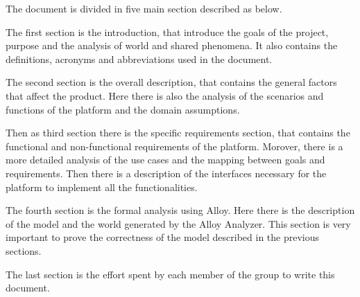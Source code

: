 The document is divided in five main section described as below.

The first section is the introduction, that introduce the goals of the project, purpose and the analysis of world and shared phenomena. It also contains the definitions, acronyms and abbreviations used in the document. 

The second section is the overall description, that contains the general factors that affect the product. Here there is also the analysis of the scenarios and functions of the platform and the domain assumptions.

Then as third section there is the specific requirements section, that contains the functional and non-functional requirements of the platform. Morover, there is a more detailed analysis of the use cases and the mapping between goals and requirements. Then there is a description of the interfaces necessary for the platform to implement all the functionalities.

The fourth section is the formal analysis using Alloy. Here there is the description of the model and the world generated by the Alloy Analyzer. This section is very important to prove the correctness of the model described in the previous sections.

The last section is the effort spent by each member of the group to write this document.
